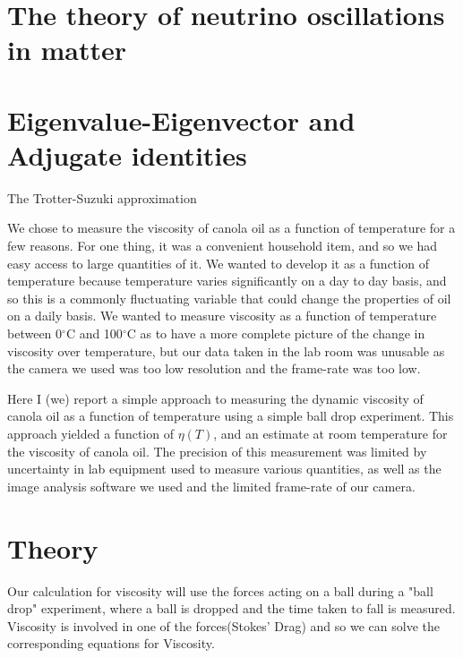 \documentclass[aps,twocolumn,showpacs,preprintnumbers]{revtex4}
\begin{document}
\section{The theory of neutrino oscillations in matter}

\section{Eigenvalue-Eigenvector and Adjugate identities}

The Trotter-Suzuki approximation


We chose to measure the viscosity of canola oil as a function of temperature for a few reasons. For one thing, it was a convenient household item, and so we had easy access to large quantities of it. We wanted to develop it as a function of temperature because temperature varies significantly on a day to day basis, and so this is a commonly fluctuating variable that could change the properties of oil on a daily basis. We wanted to measure viscosity as a function of temperature between 0$^{\circ}$C and 100$^{\circ}$C as to have a more complete picture of the change in viscosity over temperature, but our data taken in the lab room was unusable as the camera we used was too low resolution and the frame-rate was too low. 


Here I (we) report a simple approach to measuring the dynamic viscosity of canola oil as a function of temperature using a simple ball drop experiment.
This approach yielded a function of $\eta (T)$, and an estimate at room temperature for the viscosity of canola oil.
The precision of this measurement was limited by uncertainty in lab equipment used to measure various quantities, as well as the image analysis software we used and the limited frame-rate of our camera. 

\section{Theory}
Our calculation for viscosity will use the forces acting on a ball during a "ball drop" experiment, where a ball is dropped and the time taken to fall is measured. Viscosity is involved in one of the forces(Stokes' Drag)\cite{Chem_Book_Stokes_Drag} and so we can solve the corresponding equations for Viscosity.
\end{document}
